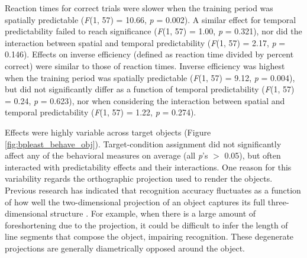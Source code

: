 \documentclass[dwyatte_dissertation.tex]{subfiles}
\begin{document}


Reaction times for correct trials were slower when the training period was spatially predictable (\textit{F}(1, 57) = 10.66, \textit{p} = 0.002). A similar effect for temporal predictability failed to reach significance (\textit{F}(1, 57) = 1.00, \textit{p} = 0.321), nor did the interaction between spatial and temporal predictability (\textit{F}(1, 57) = 2.17, \textit{p} = 0.146). Effects on inverse efficiency (defined as reaction time divided by percent correct) were similar to those of reaction times. Inverse efficiency was highest when the training period was spatially predictable (\textit{F}(1, 57) = 9.12, \textit{p} = 0.004), but did not significantly differ as a function of temporal predictability (\textit{F}(1, 57) = 0.24, \textit{p} = 0.623), nor when considering the interaction between spatial and temporal predictability (\textit{F}(1, 57) = 1.22, \textit{p} = 0.274).

Effects were highly variable across target objects (Figure \ref{fig:bpleast_behave_obj}). Target-condition assignment did not significantly affect any of the behavioral measures on average (all \textit{p}'s $>$ 0.05), but often interacted with predictability effects and their interactions. One reason for this variability regards the orthographic projection used to render the objects. Previous research has indicated that recognition accuracy fluctuates as a function of how well the two-dimensional projection of an object captures its full three-dimensional structure \cite{BalasSinha09b}. For example, when there is a large amount of foreshortening due to the projection, it could be difficult to infer the length of line segments that compose the object, impairing recognition. These degenerate projections are generally diametrically opposed around the object. 
\end{document}
